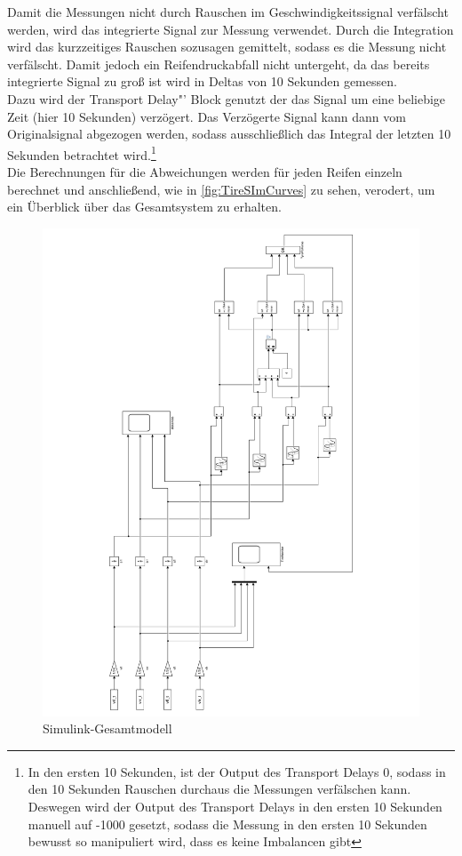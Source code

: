 \vspace{-1em}
Damit die Messungen nicht durch Rauschen im Geschwindigkeitssignal verfälscht werden, wird das integrierte Signal zur Messung verwendet. Durch die Integration wird das kurzzeitiges Rauschen sozusagen gemittelt, sodass es die Messung nicht verfälscht. Damit jedoch ein Reifendruckabfall nicht untergeht, da das bereits integrierte Signal zu groß ist wird in Deltas von 10 Sekunden gemessen.\\
Dazu wird der  \glqq Transport Delay"' Block genutzt der das Signal um eine beliebige Zeit (hier 10 Sekunden) verzögert. Das Verzögerte Signal kann dann vom Originalsignal abgezogen werden, sodass ausschließlich das Integral der letzten 10 Sekunden betrachtet wird.\footnote{In den ersten 10 Sekunden, ist der Output des Transport Delays 0, sodass in den 10 Sekunden Rauschen durchaus die Messungen verfälschen kann. Deswegen wird der Output des Transport Delays in den ersten 10 Sekunden manuell auf -1000 gesetzt, sodass die Messung in den ersten 10 Sekunden bewusst so manipuliert wird, dass es keine Imbalancen gibt }\\
Die Berechnungen für die Abweichungen werden für jeden Reifen einzeln berechnet und anschließend, wie in \autoref{fig:TireSImCurves} zu sehen, verodert, um ein Überblick über das Gesamtsystem zu erhalten.\\


\begin{figure}[H]
	\centering
	\includegraphics[height=0.95\textheight]{../Graphiken/TireSimCurvesLandscape.pdf}
	\caption{Simulink-Gesamtmodell}
	\label{fig:TireSImCurves}
\end{figure}

